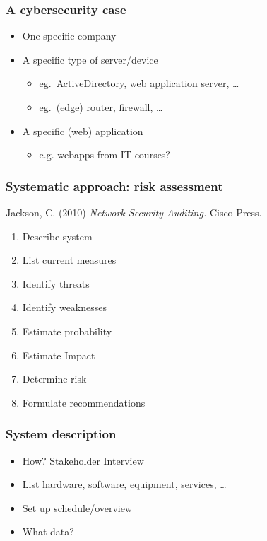 \documentclass[aspectratio=169]{beamer}
\begin{document}
\begin{frame}
    \frametitle{A cybersecurity case}
    
   \begin{itemize}
       \item One specific company
       \item A specific type of server/device
       \begin{itemize}
           \item eg.\ ActiveDirectory, web application server, \ldots
           \item eg.\ (edge) router, firewall, \ldots
       \end{itemize}
       \item A specific (web) application
       \begin{itemize}
           \item e.g. webapps from IT courses?
       \end{itemize}
   \end{itemize}
    
\end{frame}

\begin{frame}
    \frametitle{Systematic approach: risk assessment}
    
    Jackson, C. (2010) \textit{Network Security Auditing.} Cisco Press.
    
    \begin{enumerate}
       \item Describe system
       \item List current measures
       \item Identify threats
       \item Identify weaknesses
       \item Estimate probability
       \item Estimate Impact
       \item Determine risk
       \item Formulate recommendations
    \end{enumerate}
    
\end{frame}

\begin{frame}
    \frametitle{System description}
    
    \begin{itemize}
       \item How? Stakeholder Interview
       \item List hardware, software, equipment, services, \ldots
       \item Set up schedule/overview
       \item What data?
    \end{itemize}
    
\end{frame}
\end{document}
